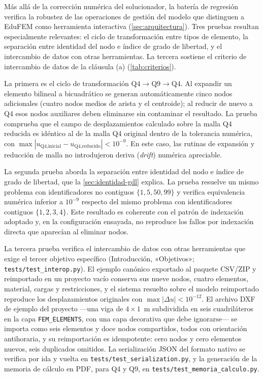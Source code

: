 Más allá de la corrección numérica del solucionador, la batería de regresión verifica la robustez de las operaciones de gestión del modelo que distinguen a EduFEM como herramienta interactiva (\autoref{sec:arquitectura}). Tres pruebas resultan especialmente relevantes: el ciclo de transformación entre tipos de elemento, la separación entre identidad del nodo e índice de grado de libertad, y el intercambio de datos con otras herramientas. La tercera sostiene el criterio de intercambio de datos de la cláusula (a) (\autoref{tab:criterios}).

La primera es el ciclo de transformación $\text{Q4}\rightarrow\text{Q9}\rightarrow\text{Q4}$. Al expandir un elemento bilineal a bicuadrático se generan automáticamente cinco nodos adicionales (cuatro nodos medios de arista y el centroide); al reducir de nuevo a Q4 esos nodos auxiliares deben eliminarse sin contaminar el resultado. La prueba comprueba que el campo de desplazamientos calculado sobre la malla Q4 reducida es idéntico al de la malla Q4 original dentro de la tolerancia numérica, con $\max|u_{\text{Q4,inicial}} - u_{\text{Q4,reducido}}| < 10^{-9}$. En este caso, las rutinas de expansión y reducción de malla no introdujeron deriva (\emph{drift}) numérica apreciable.

La segunda prueba aborda la separación entre identidad del nodo e índice de grado de libertad, que la \autoref{sec:identidad-gdl} explica. La prueba resuelve un mismo problema con identificadores no contiguos $\{1,5,50,99\}$ y verifica equivalencia numérica inferior a $10^{-9}$ respecto del mismo problema con identificadores contiguos $\{1,2,3,4\}$. Este resultado es coherente con el patrón de indexación adoptado y, en la configuración ensayada, no reproduce los fallos por indexación directa que aparecían al eliminar nodos.

La tercera prueba verifica el intercambio de datos con otras herramientas que exige el tercer objetivo específico (Introducción, «Objetivos»; \texttt{tests/test\_interop.py}). El ejemplo canónico exportado al paquete CSV/ZIP y reimportado en un proyecto vacío conserva sus nueve nodos, cuatro elementos, material, cargas y restricciones, y el sistema resuelto sobre el modelo reimportado reproduce los desplazamientos originales con $\max|\Delta u| < 10^{-12}$. El archivo DXF de ejemplo del proyecto —una viga de $4\times1$~m subdividida en seis cuadriláteros en la capa \texttt{FEM\_ELEMENTS}, con una capa decorativa que debe ignorarse— se importa como seis elementos y doce nodos compartidos, todos con orientación antihoraria, y su reimportación es idempotente: cero nodos y cero elementos nuevos, seis duplicados omitidos. La serialización JSON del formato nativo se verifica por ida y vuelta en \texttt{tests/test\_serialization.py}, y la generación de la memoria de cálculo en PDF, para Q4 y Q9, en \texttt{tests/test\_memoria\_calculo.py}.

